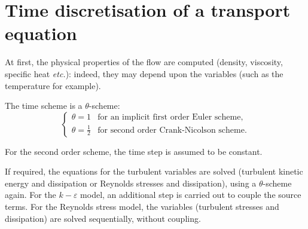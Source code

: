 
%
%
%
%


\section{Time discretisation of a transport equation}

At first, the physical properties of the flow are computed (density,
viscosity, specific heat \emph{etc.}): indeed, they may depend upon the variables
(such as the temperature for example).

The time scheme is a $\theta$-scheme:
\begin{equation}
\left\{%
\begin{array}{ll}
\theta = 1 & \text{for an implicit first order Euler scheme}, \\
\theta = \frac{1}{2} & \text{for second order Crank-Nicolson scheme}.
\end{array}
\right.
\end{equation}

For the second order scheme, the time step is assumed to be constant.

If required, the equations for the turbulent variables are solved (turbulent
kinetic energy and dissipation or Reynolds stresses and dissipation), using
a $\theta$-scheme again. For the $k-\varepsilon$ model, an additional step
is carried out to couple the source terms. For the Reynolds stress model,
the variables (turbulent stresses and dissipation) are solved sequentially,
without coupling.

